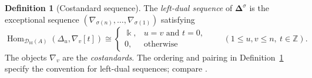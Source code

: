 \documentclass[11pt,a4paper]{article}
\newcommand{\defn}[1]{\textsl{\color{darkblue} #1}}
\newcommand{\D}{\mathcal D}
\newcommand{\ZZ}{\mathbb{Z}}
\newcommand{\std}{\Delta}
\newcommand{\costd}{\nabla}
\DeclareMathOperator{\fd}{fd}
\DeclareMathOperator{\Hom}{Hom}
\theoremstyle{plain}
\theoremstyle{definition}
\newtheorem{definition}[theorem]{Definition}
\numberwithin{equation}{section}
\begin{document}
\begin{definition}[Costandard sequence]\label{adv:dual-definition}
The \defn{left-dual sequence} of
$\boldsymbol\std^\sigma$
is the exceptional sequence
$(\costd_{\sigma(n)},\ldots,\costd_{\sigma(1)})$ satisfying
\begin{equation}\label{adv:pairing}
 \Hom_{\D_{\fd}(A)}(\std_u,\costd_v[t])\cong
 \begin{cases}
 \Bbbk,&u=v\text{ and }t=0,\\
 0,&\text{otherwise}
 \end{cases}
 \qquad(1\leq u,v\leq n,\ t\in\ZZ).
\end{equation}
The objects $\costd_v$ are the \defn{costandards}.
The ordering and pairing in Definition~\ref{adv:dual-definition}
specify the convention for left-dual sequences; compare
\cite[\S2.3]{BB26}.
\end{definition}
\end{document}
